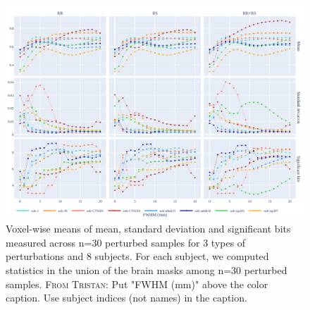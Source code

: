 \documentclass{article}
\newcommand{\TG}[1]{\color{blue}\textsc{From Tristan:} #1\color{black}\xspace}
\begin{document}
\begin{figure}
    \centering
    \includegraphics[width=\linewidth]{figures/stats.pdf}
    \caption{Voxel-wise means of mean, standard deviation and significant bits
        measured across n=30 perturbed samples for 3 types of perturbations and 8
        subjects. For each subject, we computed statistics in the union of the brain
        masks among n=30 perturbed samples. \TG{Put "FWHM (mm)" above the color caption. Use subject indices (not names) in the caption.}}
    \label{fig:significant-digits}
\end{figure}
\end{document}
